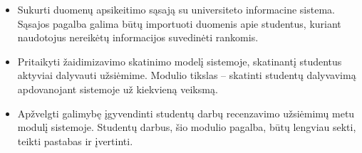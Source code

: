 \documentclass{VUMIFPSkursinis}
\begin{document}

\begin{itemize}
	\item Sukurti duomenų apsikeitimo sąsają su universiteto informacine sistema. Sąsajos pagalba galima būtų importuoti duomenis apie studentus, kuriant naudotojus nereikėtų informacijos suvedinėti rankomis.
	\item Pritaikyti žaidimizavimo skatinimo modelį sistemoje, skatinantį studentus aktyviai dalyvauti užsiėmime. Modulio tikslas – skatinti studentų dalyvavimą apdovanojant sistemoje už kiekvieną veiksmą.
	\item Apžvelgti galimybę įgyvendinti studentų darbų recenzavimo užsiėmimų metu modulį sistemoje. Studentų darbus, šio modulio pagalba, būtų lengviau sekti, teikti pastabas ir įvertinti. 
\end{itemize}

\printbibliography[heading=bibintoc]  %


\end{document}
